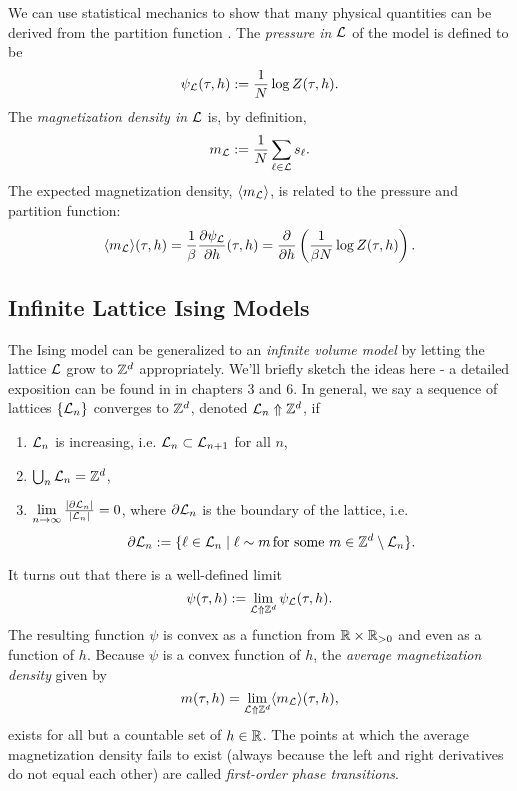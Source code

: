 \documentclass[10pt,reqno]{amsart}
\begin{document}
	We can use statistical mechanics to show that many physical quantities can be derived from the partition function \cite[Ch. 3]{friedli_velenik_2017}.
	The \emph{pressure in $\mathcal{L}$} of the model is defined to be 
	\[\psi_{\mathcal{L}}(\tau,h):=\frac{1}{N} \log Z(\tau,h).  \]
	The \emph{magnetization density in $\mathcal{L}$} is, by definition,
	\[ m_{\mathcal{L}}:=\frac{1}{N}\sum_{\ell \in \mathcal{L}} s_\ell. \]
	The expected magnetization density, $\langle m_{\mathcal{L}} \rangle$, is related to the pressure and partition function:
	\[\langle m_{\mathcal{L}} \rangle (\tau,h) = \frac{1}{\beta}\frac{\partial \psi_{\mathcal{L}}}{\partial h}(\tau, h)=\frac{\partial}{\partial h}\left( \frac{1}{\beta N} \log Z(\tau,h)\right) . \]
	
	
	\subsection{Infinite Lattice Ising Models}
	
	The Ising model can be generalized to an \emph{infinite volume model} by letting the lattice $\mathcal{L}$ grow to $\mathbb{Z}^d$ appropriately. 
	We'll briefly sketch the ideas here - a detailed exposition can be found in \cite{friedli_velenik_2017} in chapters 3 and 6.
	In general, we say a sequence of lattices $\{\mathcal{L}_n \}$ converges to $\mathbb{Z}^d$, denoted $\mathcal{L}_n \Uparrow \mathbb{Z}^d$, if 
	\begin{enumerate}
		\item $\mathcal{L}_n$ is increasing, i.e. $\mathcal{L}_n \subset \mathcal{L}_{n+1}$ for all $n$,
		\item $\bigcup_{n} \mathcal{L}_n = \mathbb{Z}^d$,
		\item $\lim\limits_{n\to \infty} \frac{|\partial \mathcal{L}_n|}{|\mathcal{L}_n|}=0$, where $\partial \mathcal{L}_n$ is the boundary of the lattice, i.e. 
		\[\partial \mathcal{L}_n := \{\ell \in \mathcal{L}_n \mid \ell \sim m \, \text{for some $m$}\in \mathbb{Z}^d \setminus \mathcal{L}_n \}. \]
	\end{enumerate}
	It turns out that there is a well-defined limit 
		\[\psi(\tau,h):= \lim\limits_{\mathcal{L} \Uparrow \mathbb{Z}^d} \psi_{\mathcal{L}}(\tau,h).\]
	The resulting function $\psi$ is convex as a function from $\mathbb{R} \times \mathbb{R}_{>0}$ and even as a function of $h$.
	Because $\psi$ is a convex function of $h$, the \emph{average magnetization density} given by
		\[m(\tau,h)=\lim_{\mathcal{L} \Uparrow \mathbb{Z}^d} \langle m_{\mathcal{L}} \rangle (\tau, h), \]
	exists for all but a countable set of $h \in \mathbb{R}$.
	The points at which the average magnetization density fails to exist (always because the left and right derivatives do not equal each other) are called \emph{first-order phase transitions}.
		
\end{document}
